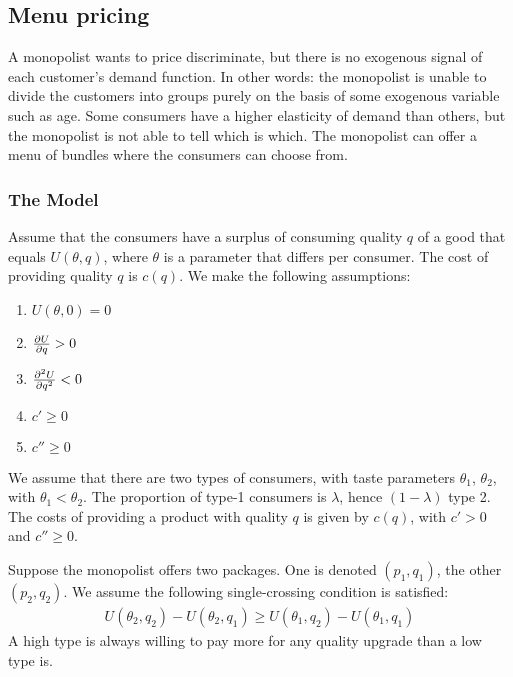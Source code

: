 \subsection{Menu pricing}
A monopolist wants to price discriminate, but there is no exogenous signal
of each customer's demand function. In other words: the monopolist is unable
to divide the customers into groups purely on the basis of some exogenous variable
such as age. Some consumers have a higher elasticity of demand than others, but the monopolist
is not able to tell which is which. The monopolist can offer a menu of bundles
where the consumers can choose from.
\subsubsection{The Model}
Assume that the consumers have a surplus of consuming quality $q$ of a good that
equals $U(\theta, q)$, where $\theta$ is a parameter that differs per consumer.
The cost of providing quality $q$  is $c(q)$. We make the following assumptions:
\begin{enumerate}
	\item $U(\theta,0)=0$
	\item $\frac{\partial U}{\partial q}>0$
	\item $\frac{\partial^2 U}{\partial q^2}<0$
	\item $c'\geq0$
	\item $c''\geq0$
\end{enumerate}

We assume that there are two types of consumers, with taste parameters
$\theta_1$, $\theta_2$, with $\theta_1<\theta_2$. The proportion of type-1
consumers is $\lambda$, hence $(1-\lambda)$ type 2. The costs of providing
a product with quality $q$ is given by $c(q)$, with $c'>0$ and $c''\geq0$.

Suppose the monopolist offers two packages. One is denoted $(p_1, q_1)$, the other
$(p_2,q_2)$. We assume the following single-crossing condition is satisfied:
\begin{align}
	U(\theta_2,q_2)-U(\theta_2,q_1)\geq U(\theta_1,q_2)-U(\theta_1,q_1)
\end{align}
A high type is always willing to pay more for any quality upgrade than a low
type is.

